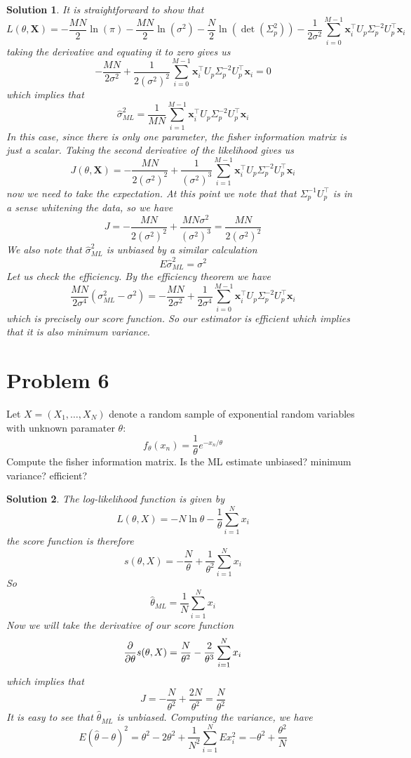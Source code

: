 \documentclass[a4paper]{article}
\newtheorem*{sol}{Solution}
\begin{document}
\begin{sol}
 It is straightforward to show that 
 \[
   L(\theta, \bm{X}) = -\frac{MN}{2} \ln (\pi) - \frac{MN}{2}\ln(\sigma^2) - \frac{N}{2} \ln (\det (\Sigma_p^2)) - \frac{1}{2\sigma^2} \sum_{i=0}^{M-1} \bm{x}_i^\top U_p \Sigma_p^{-2} U_p^\top \bm{x}_i
 \]
 taking the derivative and equating it to zero gives us
 \[
   -\frac{MN}{2\sigma^2} + \frac{1}{2(\sigma^2)^2} \sum_{i=0}^{M-1} \bm{x}_i^\top U_p \Sigma_p^{-2} U_p^\top \bm{x}_i = 0
 \]
 which implies that
 \[
   \hat{\sigma}^2_{ML} = \frac{1}{MN} \sum_{i=1}^{M-1}\bm{x}_i^\top U_p \Sigma_p^{-2} U_p^\top \bm{x}_i
 \]
 In this case, since there is only one parameter, the fisher information matrix is just a scalar. Taking the second derivative of the likelihood gives us
 \[
   J(\theta, \bm{X}) = - \frac{MN}{2 (\sigma^2)^2} + \frac{1}{(\sigma^2)^3}\sum_{i=1}^{M-1}\bm{x}_i^\top U_p \Sigma_p^{-2} U_p^\top \bm{x}_i
 \]
 now we need to take the expectation. At this point we note that that $\Sigma_p^{-1}U_p^\top$ is in a sense whitening the data, so we have
 \[
   J = -\frac{MN}{2(\sigma^2)^2} + \frac{MN\sigma^2}{(\sigma^2)^3} = \frac{MN}{2(\sigma^2)^2}
 \]
 We also note that $\hat{\sigma}^2_{ML}$ is unbiased by a similar calculation
 \[
   E \hat{\sigma}^2_{ML} = \sigma^2
 \]
 Let us check the efficiency. By the efficiency theorem we have
 \[
   \frac{MN}{2\sigma^4}(\sigma^2_{ML} - \sigma^2) = -\frac{MN}{2\sigma^2} + \frac{1}{2\sigma^4} \sum_{i=0}^{M-1} \bm{x}_i^\top U_p \Sigma_p^{-2} U_p^\top \bm{x}_i 
 \]
 which is precisely our score function. So our estimator is efficient which implies that it is also minimum variance.
\end{sol}

\section*{Problem 6}%
Let $X = (X_1, \dots, X_N)$ denote a random sample of exponential random variables with unknown paramater $\theta$:
\[
  f_{\theta}(x_n) = \frac{1}{\theta} e^{-x_n/\theta}
\]
Compute the fisher information matrix. Is the ML estimate unbiased? minimum variance? efficient?

\begin{sol}
  The log-likelihood function is given by
  \[
    L(\theta, X) = -N \ln \theta - \frac{1}{\theta} \sum_{i=1}^N x_i
  \]
  the score function is therefore
  \[
    s(\theta, X) = -\frac{N}{\theta} + \frac{1}{\theta^2} \sum_{i=1}^N x_i
  \]
  So 
  \[
    \hat{\theta}_{ML} = \frac{1}{N} \sum_{i=1}^N x_i
  \]
  Now we will take the derivative of our score function
  \[
    \pdv{\theta} s(\theta, X) = \frac{N}{\theta^2} - \frac{2}{\theta^3} \sum_{i=1}^N x_i
  \]
  which implies that 
  \[
    J = -\frac{N}{\theta^2} + \frac{2N}{\theta^2} = \frac{N}{\theta^2}
  \]
  It is easy to see that $\hat{\theta}_{ML}$ is unbiased. Computing the variance, we have
  \[
    E(\hat{\theta} - \theta)^2 = \theta^2 - 2 \theta^2  + \frac{1}{N^2} \sum_{i=1}^N E x_i^2 = -\theta^2  + \frac{\theta^2}{N}
  \]
\end{sol}
\end{document}
